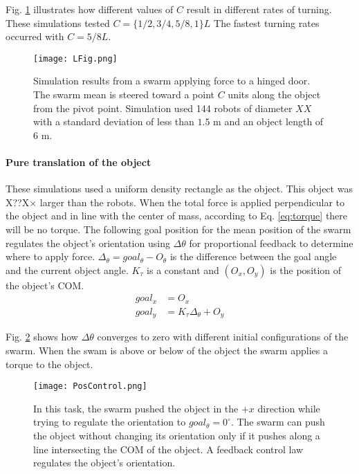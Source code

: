  Fig. \ref{fig:LFig} illustrates how different values of $C$ result in different rates of turning. These simulations tested $C = \{1/2, 3/4, 5/8, 1\}L$  The fastest turning rates occurred with  $C =  5/8L$. 



\begin{figure}
\begin{center}
	\texttt{[image: LFig.png]}
\end{center}
\vspace{-1em}
\caption{\label{fig:LFig}
Simulation results from a swarm applying force to a hinged door. 
The swarm mean is steered toward a point $C$ units along the object from the pivot point. 
 Simulation used 144 robots of diameter $XX$ with a standard deviation of less than $1.5$ m and an object length of $6$ m.
}
\vspace{-1em}
\end{figure}
\paragraph{Pure translation of the object} \label{para:PureTranslation}
These simulations used a uniform density rectangle as the object. This object was X??X$\times$ larger than the robots.
When the total force is applied perpendicular to the object and in line with the center of mass, according to Eq. \ref{eq:torque} there will be no torque. 
The following goal position for the mean position of the swarm regulates the object's orientation using $\Delta \theta$ for proportional feedback  to determine where to apply force.
$\Delta_\theta = goal_\theta - O_\theta$ is the difference between the goal angle and the current object angle.
 $K_\tau$ is a constant and $(O_x,O_y)$ is the position of the object's COM.
\begin{align}
goal_x &= O_x \nonumber \\
goal_y &= K_\tau \Delta_\theta + O_y
\end{align}

 Fig. \ref{fig:PosControlFig} shows how $\Delta \theta$ converges to zero with different initial configurations of the swarm. When the swam is above or below of the object the swarm applies a torque to the object.
 
 
\begin{figure}
\begin{center}
	\texttt{[image: PosControl.png]}
\end{center}
\vspace{-1em}
\caption{\label{fig:PosControlFig}
In this task, the swarm pushed the object in the $+x$ direction while trying to regulate the orientation to $goal_\theta = 0^\circ$.
 The swarm can push the object without changing its orientation only if it pushes along a line intersecting the COM of the object.  A feedback control law regulates the object's orientation.
}
\vspace{-1em}
\end{figure}

